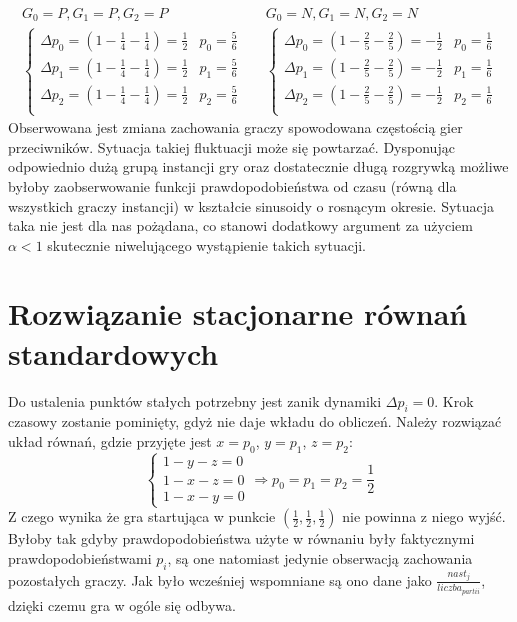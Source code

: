 \begin{align*}
G_0 = P, G_1 = P, G_2 = P && G_0 = N, G_1 = N, G_2 = N \\
\left\{
\begin{array}{cc}
\Delta p_0 = (1 - \frac{1}{4} - \frac{1}{4}) =  \frac{1}{2} & p_0= \frac{5}{6}\\
\Delta p_1 = (1 - \frac{1}{4} - \frac{1}{4}) =  \frac{1}{2} & p_1= \frac{5}{6}\\
\Delta p_2 = (1 - \frac{1}{4} - \frac{1}{4}) =  \frac{1}{2} & p_2= \frac{5}{6}\\
\end{array} 
\right. &&
\left\{
\begin{array}{cc}
\Delta p_0 = (1 - \frac{2}{5} - \frac{2}{5}) =  -\frac{1}{2} & p_0= \frac{1}{6}\\
\Delta p_1 = (1 - \frac{2}{5} - \frac{2}{5}) =  -\frac{1}{2} & p_1= \frac{1}{6}\\
\Delta p_2 = (1 - \frac{2}{5} - \frac{2}{5}) =  -\frac{1}{2} & p_2= \frac{1}{6}\\
\end{array}
\right.
\end{align*}
Obserwowana jest zmiana zachowania graczy spowodowana częstością gier przeciwników. Sytuacja takiej fluktuacji może się powtarzać. Dysponując odpowiednio dużą grupą instancji gry oraz dostatecznie długą rozgrywką możliwe byłoby zaobserwowanie funkcji prawdopodobieństwa od czasu (równą dla wszystkich graczy instancji) w kształcie sinusoidy o rosnącym okresie.
Sytuacja taka nie jest dla nas pożądana, co stanowi dodatkowy argument za użyciem $\alpha < 1$ skutecznie niwelującego wystąpienie takich sytuacji.

\section{Rozwiązanie stacjonarne równań standardowych}
\label{sec:stab_stand}
Do ustalenia punktów stałych potrzebny jest zanik dynamiki $\Delta p_i = 0$. Krok czasowy zostanie pominięty, gdyż nie daje wkładu do obliczeń. Należy rozwiązać układ równań, gdzie przyjęte jest $x=p_0$, $y=p_1$, $z=p_2$:
\begin{equation}
\left\{
\begin{array}{c}
1 - y - z = 0 \\
1 - x - z = 0 \\
1 - x - y = 0
\end{array}
\right. \Rightarrow p_0 = p_1 = p_2 = \frac{1}{2}
\end{equation}
Z czego wynika że gra startująca w punkcie $(\frac{1}{2},\frac{1}{2},\frac{1}{2})$ nie powinna z niego wyjść. Byłoby tak gdyby prawdopodobieństwa użyte w równaniu były faktycznymi prawdopodobieństwami $p_i$, są one natomiast jedynie obserwacją zachowania pozostałych graczy. Jak było wcześniej wspomniane są ono dane jako $\frac{nast_j}{liczba_{partii}}$, dzięki czemu gra w ogóle się odbywa.
